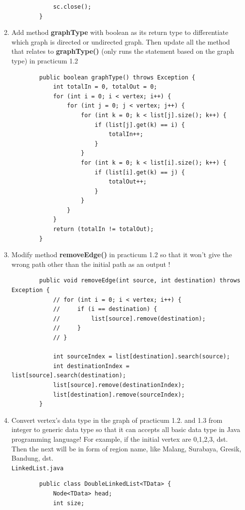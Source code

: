 \documentclass[12pt,titlepage]{article}
\begin{document}
\begin{enumerate}
\begin{verbatim}
            sc.close();
        }
    \end{verbatim}
    \item Add method \textbf{graphType} with boolean as its return type to differentiate which graph is directed or undirected graph. Then update all the method that relates to \textbf{graphType()} (only runs the statement based on the graph type) in practicum 1.2
    \begin{verbatim}
        public boolean graphType() throws Exception {
            int totalIn = 0, totalOut = 0;
            for (int i = 0; i < vertex; i++) {
                for (int j = 0; j < vertex; j++) {
                    for (int k = 0; k < list[j].size(); k++) {
                        if (list[j].get(k) == i) {
                            totalIn++;
                        }
                    }
                    for (int k = 0; k < list[i].size(); k++) {
                        if (list[i].get(k) == j) {
                            totalOut++;
                        }
                    }
                }
            }
            return (totalIn != totalOut);
        }
    \end{verbatim}
    \item Modify method \textbf{removeEdge()} in practicum 1.2 so that it won’t give the wrong path other than the initial path as an output !
    \begin{verbatim}
        public void removeEdge(int source, int destination) throws Exception {
            // for (int i = 0; i < vertex; i++) {
            //     if (i == destination) {
            //         list[source].remove(destination);
            //     }
            // }

            int sourceIndex = list[destination].search(source);
            int destinationIndex = list[source].search(destination);
            list[source].remove(destinationIndex);
            list[destination].remove(sourceIndex);
        }
    \end{verbatim}
    \item Convert vertex’s data type in the graph of practicum 1.2. and 1.3 from integer to generic data type so that it can accepts all basic data type in Java programming language! For example, if the initial vertex are 0,1,2,3, dst. Then the next will be in form of region name, like Malang, Surabaya, Gresik, Bandung, dst.
    \mbox{}\\ \texttt{LinkedList.java}
    \begin{verbatim}
        public class DoubleLinkedList<TData> {
            Node<TData> head;
            int size;


\end{verbatim}
\end{enumerate}
\end{document}
